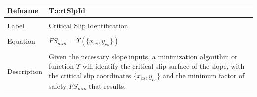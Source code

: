 \documentclass[12pt]{article}
\begin{document}
~\newline
\noindent \begin{minipage}{\textwidth}
\begin{tabular}{p{} p{}}
\toprule \textbf{Refname} & \textbf{T:crtSlpId}
\label{T:crtSlpId}
\\ \midrule \\
Label & Critical Slip Identification
\\ \midrule \\
Equation & ${FS_{min}}=Υ\left(\{{x_{cs}}{,y_{cs}}\}\right)$
\\ \midrule \\
Description & Given the necessary slope inputs, a minimization algorithm or function $Υ$ will identify the critical slip surface of the slope, with the critical slip coordinates $\{{x_{cs}}{,y_{cs}}\}$ and the minimum factor of safety ${FS_{min}}$ that results.
\\ \bottomrule \end{tabular}
\end{minipage}\\
\end{document}

